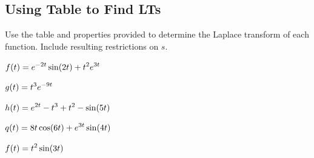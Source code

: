 \subsection*{Using Table to Find LTs}
\begin{DEPP}[resume]
\item  Use the table and properties provided to determine the Laplace transform of each function.
Include resulting restrictions on $s.$
 \ben[label=(\alph*)]
 \item  $\displaystyle f(t) = e^{-2t}\sin(2t) + t^2 e^{3t}$\\
 \item  $\displaystyle g(t) = t^3 e^{-9t}$\\
 \item  $\displaystyle h(t) = e^{2t} - t^3 + t^2 - \sin (5t)$\\
 \item  $\displaystyle q(t) = 8t\cos(6t) + e^{3t}\sin(4t)$\\
 \item  $\displaystyle f(t) = t^2 \sin(3t)$\\
 \een
\end{DEPP}
